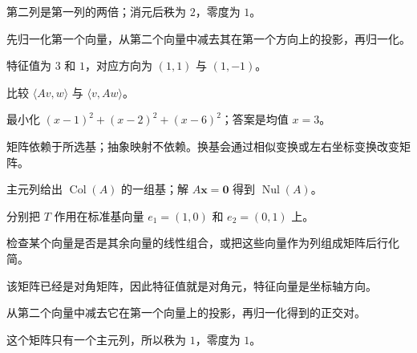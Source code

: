 \begin{selectedhints}
    \item 第二列是第一列的两倍；消元后秩为 $2$，零度为 $1$。
    \item 先归一化第一个向量，从第二个向量中减去其在第一个方向上的投影，再归一化。
    \item 特征值为 $3$ 和 $1$，对应方向为 $(1,1)$ 与 $(1,-1)$。
    \item 比较 $\langle Av,w\rangle$ 与 $\langle v,Aw\rangle$。
    \item 最小化 $(x-1)^2+(x-2)^2+(x-6)^2$；答案是均值 $x=3$。
    \item 矩阵依赖于所选基；抽象映射不依赖。换基会通过相似变换或左右坐标变换改变矩阵。
    \item 主元列给出 $\operatorname{Col}(A)$ 的一组基；解 $A\mathbf{x}=\mathbf{0}$ 得到 $\operatorname{Nul}(A)$。
    \item 分别把 $T$ 作用在标准基向量 $e_1=(1,0)$ 和 $e_2=(0,1)$ 上。
    \item 检查某个向量是否是其余向量的线性组合，或把这些向量作为列组成矩阵后行化简。
    \item 该矩阵已经是对角矩阵，因此特征值就是对角元，特征向量是坐标轴方向。
    \item 从第二个向量中减去它在第一个向量上的投影，再归一化得到的正交对。
    \item 这个矩阵只有一个主元列，所以秩为 $1$，零度为 $1$。
\end{selectedhints}
